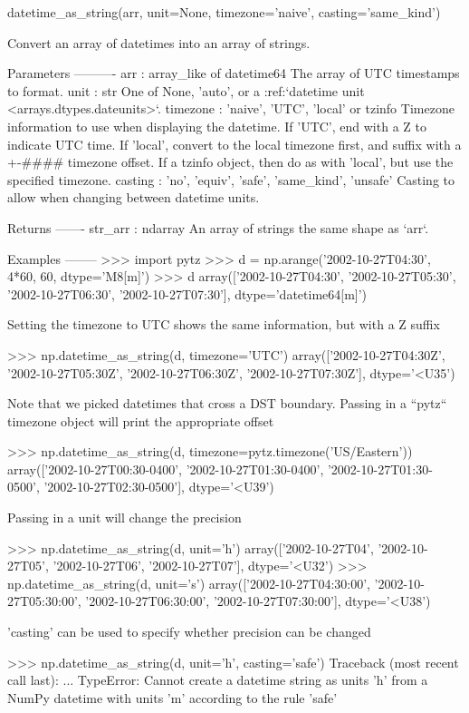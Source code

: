 \begin{DoxyVerb}datetime_as_string(arr, unit=None, timezone='naive', casting='same_kind')

Convert an array of datetimes into an array of strings.

Parameters
----------
arr : array_like of datetime64
    The array of UTC timestamps to format.
unit : str
    One of None, 'auto', or a :ref:`datetime unit <arrays.dtypes.dateunits>`.
timezone : {'naive', 'UTC', 'local'} or tzinfo
    Timezone information to use when displaying the datetime. If 'UTC', end
    with a Z to indicate UTC time. If 'local', convert to the local timezone
    first, and suffix with a +-#### timezone offset. If a tzinfo object,
    then do as with 'local', but use the specified timezone.
casting : {'no', 'equiv', 'safe', 'same_kind', 'unsafe'}
    Casting to allow when changing between datetime units.

Returns
-------
str_arr : ndarray
    An array of strings the same shape as `arr`.

Examples
--------
>>> import pytz
>>> d = np.arange('2002-10-27T04:30', 4*60, 60, dtype='M8[m]')
>>> d
array(['2002-10-27T04:30', '2002-10-27T05:30', '2002-10-27T06:30',
       '2002-10-27T07:30'], dtype='datetime64[m]')

Setting the timezone to UTC shows the same information, but with a Z suffix

>>> np.datetime_as_string(d, timezone='UTC')
array(['2002-10-27T04:30Z', '2002-10-27T05:30Z', '2002-10-27T06:30Z',
       '2002-10-27T07:30Z'], dtype='<U35')

Note that we picked datetimes that cross a DST boundary. Passing in a
``pytz`` timezone object will print the appropriate offset

>>> np.datetime_as_string(d, timezone=pytz.timezone('US/Eastern'))
array(['2002-10-27T00:30-0400', '2002-10-27T01:30-0400',
       '2002-10-27T01:30-0500', '2002-10-27T02:30-0500'], dtype='<U39')

Passing in a unit will change the precision

>>> np.datetime_as_string(d, unit='h')
array(['2002-10-27T04', '2002-10-27T05', '2002-10-27T06', '2002-10-27T07'],
      dtype='<U32')
>>> np.datetime_as_string(d, unit='s')
array(['2002-10-27T04:30:00', '2002-10-27T05:30:00', '2002-10-27T06:30:00',
       '2002-10-27T07:30:00'], dtype='<U38')

'casting' can be used to specify whether precision can be changed

>>> np.datetime_as_string(d, unit='h', casting='safe')
Traceback (most recent call last):
    ...
TypeError: Cannot create a datetime string as units 'h' from a NumPy
datetime with units 'm' according to the rule 'safe'
\end{DoxyVerb}
 \mbox{\label{namespacenumpy_1_1core_1_1multiarray_a3871b8ad563a92410dda0531e685428d}} 
